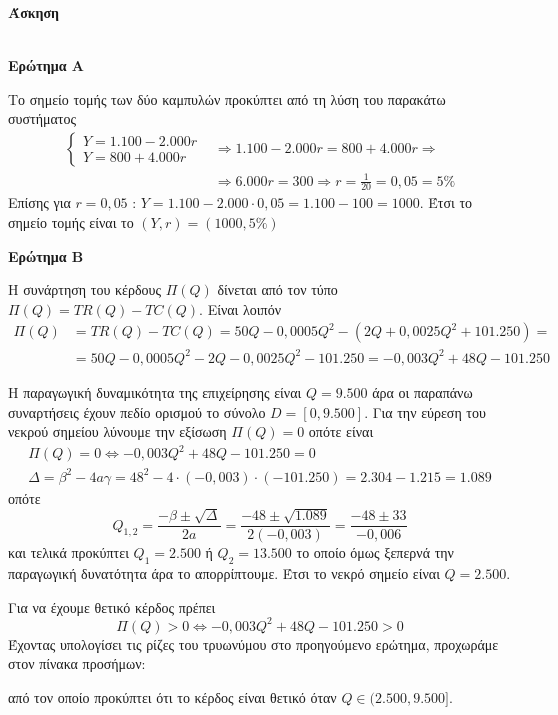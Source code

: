 \documentclass[11pt,a4paper]{article}
\newcommand{\kerkissans}[1]{{\fontfamily{maksf}\selectfont \textbf{#1}}}
\newcounter{askhsh}
\newcommand{\askhsh}{\kerkissans{\large Άσκηση \theaskhsh}\ \addtocounter{askhsh}{1}}
\begin{document}
\askhsh\\
\textbf{Ερώτημα Α}
\begin{rlist}
\item Το σημείο τομής των δύο καμπυλών προκύπτει από τη λύση του παρακάτω συστήματος
\begin{align*}
\begin{cases}
Y=1.100-2.000r\\Y=800+4.000r
\end{cases}&\Rightarrow 1.100-2.000r=800+4.000r\Rightarrow \\&
\Rightarrow6.000r=300\Rightarrow r=\frac{1}{20}=0{,}05=5\%
\end{align*}
Επίσης για $r=0{,}05$ : $Y=1.100-2.000\cdot0{,}05=1.100-100=1000$. Έτσι το σημείο τομής είναι το $(Y,r)=(1000,5\%)$
\item 
\end{rlist}
\textbf{Ερώτημα Β}
\begin{rlist}
\item Η συνάρτηση του κέρδους $\Pi(Q)$ δίνεται από τον τύπο $\Pi(Q)=TR(Q)-TC(Q)$. Είναι λοιπόν
\begin{align*}
\Pi(Q)&=TR(Q)-TC(Q)=50Q-0{,}0005Q^2-\left(2Q+0{,}0025Q^2+101.250\right)=\\&=50Q-0{,}0005Q^2-2Q-0{,}0025Q^2-101.250=-0{,}003Q^2+48Q-101.250
\end{align*}
\item Η παραγωγική δυναμικότητα της επιχείρησης είναι $Q=9.500$ άρα οι παραπάνω συναρτήσεις έχουν πεδίο ορισμού το σύνολο $D=[0,9.500]$. Για την εύρεση του νεκρού σημείου λύνουμε την εξίσωση $\Pi(Q)=0$ οπότε είναι
\begin{gather*}
\Pi(Q)=0\Leftrightarrow -0{,}003Q^2+48Q-101.250=0\\
\varDelta=\beta^2-4a\gamma=48^2-4\cdot(-0{,}003)\cdot(-101.250)=2.304-1.215=1.089
\end{gather*}
οπότε 
\[Q_{1,2}=\frac{-\beta\pm\sqrt{\varDelta}}{2a}=\frac{-48\pm\sqrt{1.089}}{2(-0{,}003)}=\frac{-48\pm 33}{-0{,}006}\]
και τελικά προκύπτει $Q_1=2.500$ ή $Q_2=13.500$ το οποίο όμως ξεπερνά την παραγωγική δυνατότητα άρα το απορρίπτουμε. Έτσι το νεκρό σημείο είναι $Q=2.500$.
\item Για να έχουμε θετικό κέρδος πρέπει \[\Pi(Q)>0\Leftrightarrow -0{,}003Q^2+48Q-101.250>0\] 
Έχοντας υπολογίσει τις ρίζες του τρυωνύμου στο προηγούμενο ερώτημα, προχωράμε στον πίνακα προσήμων:
\begin{center}
\end{center}
από τον οποίο προκύπτει ότι το κέρδος είναι θετικό όταν $Q\in(2.500,9.500]$.
\end{rlist}
\end{document}
